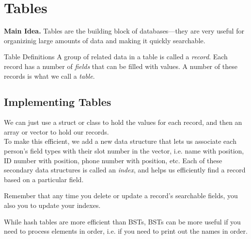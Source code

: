 \documentclass[class=article, crop=false]{standalone}
\begin{document}
  \section{Tables}
  \textbf{Main Idea.} Tables are the building block of databases---they are very useful for organizinig large amounts of data and making it quickly searchable.
  \begin{definition}{Table Definitions}
    A group of related data in a table is called a \emph{record}. Each record has a number of \emph{fields} that can be filled with values. A number of these records is what we call a \emph{table}.
  \end{definition}
  \subsection{Implementing Tables}
  We can just use a struct or class to hold the values for each record, and then an array or vector to hold our records. \\[10pt]
  To make this efficient, we add a new data structure that lets us associate each person's field types with their slot number in the vector, i.e. name with position, ID number with position, phone number with position, etc. Each of these secondary data structures is called an \emph{index}, and helps us efficiently find a record based on a particular field.
  \begin{note}{}
    Remember that any time you delete or update a record's searchable fields, you also you to update your indexes.
  \end{note}
  While hash tables are more efficient than BSTs, BSTs can be more useful if you need to process elements in order, i.e. if you need to print out the names in order.
\end{document}
